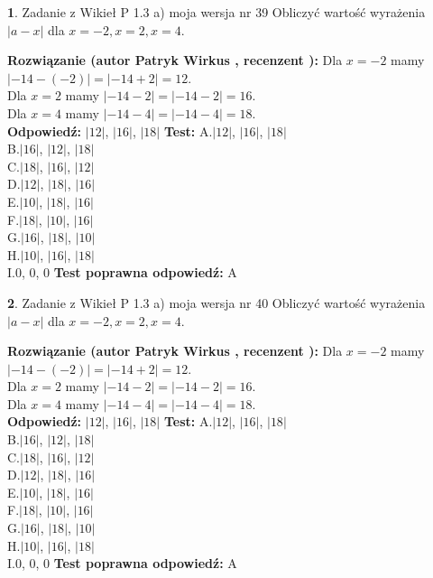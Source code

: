 \documentclass[12pt, a4paper]{article}
\theoremstyle{definition} %
\newtheorem{zad}{}
\newcommand{\zadStart}[1]{\begin{zad}#1\newline}
\newcommand{\zadStop}{\end{zad}}
\newcommand{\rozwStart}[2]{\noindent \textbf{Rozwiązanie (autor #1 , recenzent #2): }\newline}
\newcommand{\rozwStop}{\newline}
\newcommand{\odpStart}{\noindent \textbf{Odpowiedź:}\newline}
\newcommand{\odpStop}{\newline}
\newcommand{\testStart}{\noindent \textbf{Test:}\newline}
\newcommand{\testStop}{\newline}
\newcommand{\kluczStart}{\noindent \textbf{Test poprawna odpowiedź:}\newline}
\newcommand{\kluczStop}{\newline}
\begin{document}
\zadStart{Zadanie z Wikieł P 1.3 a) moja wersja nr 39}
Obliczyć wartość wyrażenia $|a - x|$ dla $x=-2,x=2,x=4$.
\zadStop
\rozwStart{Patryk Wirkus}{}
Dla $x = -2$ mamy $|-14 - (-2)| = |-14 + 2| = 12$.\\
Dla $x = 2$ mamy $|-14 - 2| = |-14 - 2| = 16$.\\
Dla $x = 4$ mamy $|-14 - 4| = |-14 - 4| = 18$.\\
\rozwStop
\odpStart
$|12|$, $|16|$, $|18|$
\odpStop
\testStart
A.$|12|$, $|16|$, $|18|$\\
B.$|16|$, $|12|$, $|18|$\\
C.$|18|$, $|16|$, $|12|$\\
D.$|12|$, $|18|$, $|16|$\\
E.$|10|$, $|18|$, $|16|$\\
F.$|18|$, $|10|$, $|16|$\\
G.$|16|$, $|18|$, $|10|$\\
H.$|10|$, $|16|$, $|18|$\\
I.$0$, $0$, $0$
\testStop
\kluczStart
A
\kluczStop



\zadStart{Zadanie z Wikieł P 1.3 a) moja wersja nr 40}
Obliczyć wartość wyrażenia $|a - x|$ dla $x=-2,x=2,x=4$.
\zadStop
\rozwStart{Patryk Wirkus}{}
Dla $x = -2$ mamy $|-14 - (-2)| = |-14 + 2| = 12$.\\
Dla $x = 2$ mamy $|-14 - 2| = |-14 - 2| = 16$.\\
Dla $x = 4$ mamy $|-14 - 4| = |-14 - 4| = 18$.\\
\rozwStop
\odpStart
$|12|$, $|16|$, $|18|$
\odpStop
\testStart
A.$|12|$, $|16|$, $|18|$\\
B.$|16|$, $|12|$, $|18|$\\
C.$|18|$, $|16|$, $|12|$\\
D.$|12|$, $|18|$, $|16|$\\
E.$|10|$, $|18|$, $|16|$\\
F.$|18|$, $|10|$, $|16|$\\
G.$|16|$, $|18|$, $|10|$\\
H.$|10|$, $|16|$, $|18|$\\
I.$0$, $0$, $0$
\testStop
\kluczStart
A
\kluczStop
\end{document}

